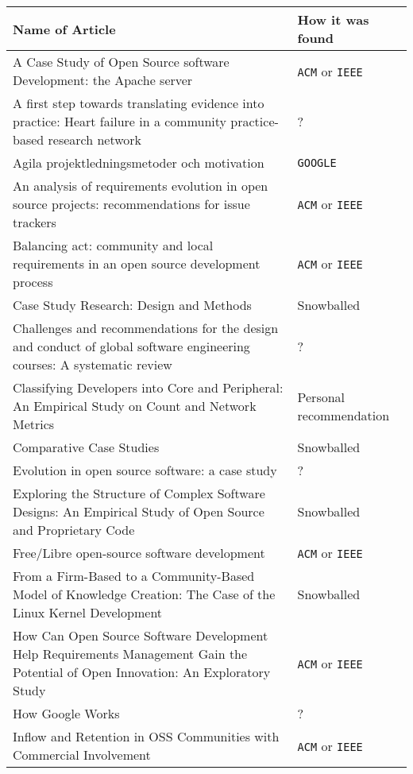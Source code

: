 \documentclass[11pt, oneside]{article}   	%
\begin{document}
\begin{table}[!h]
	\begin{tabular}{  p{}  p{} }
		\hline
		\textbf{Name of Article}	& \textbf{How it was found}	\\\hline
		A Case Study of Open Source software Development: the Apache server	& \texttt{ACM} or \texttt{IEEE}	\\\hline
		A first step towards translating evidence into practice: Heart failure in a community practice-based research network & ?	\\\hline
		Agila projektledningsmetoder och motivation & \texttt{GOOGLE}	\\\hline
		An analysis of requirements evolution in open source projects: recommendations for issue trackers	& \texttt{ACM} or \texttt{IEEE}	\\\hline
		Balancing act: community and local requirements in an open source development process	& \texttt{ACM} or \texttt{IEEE}	\\\hline
		Case Study Research: Design and Methods	& Snowballed	\\\hline
		Challenges and recommendations for the design and conduct of global software engineering courses: A systematic review	& ?	\\\hline
		Classifying Developers into Core and Peripheral: An Empirical Study on Count and Network Metrics	& Personal recommendation 	\\\hline
		Comparative Case Studies	& Snowballed	\\\hline
		Evolution in open source software: a case study	& ?	\\\hline
		Exploring the Structure of Complex Software Designs: An Empirical Study of Open Source and Proprietary Code	& Snowballed	\\\hline
		Free/Libre open-source software development	& \texttt{ACM} or \texttt{IEEE}	\\\hline
		From a Firm-Based to a Community-Based Model of Knowledge Creation: The Case of the Linux Kernel Development	& Snowballed	\\\hline
		How Can Open Source Software Development Help Requirements Management Gain the Potential of Open Innovation: An Exploratory Study	& \texttt{ACM} or \texttt{IEEE}	\\\hline
		How Google Works	& ?	\\\hline
		Inflow and Retention in OSS Communities with Commercial Involvement	& \texttt{ACM} or \texttt{IEEE}	\\\hline

\end{tabular}
\end{table}
\end{document}
